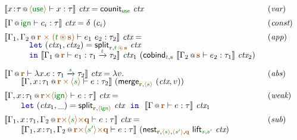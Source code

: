 \begin{figure*}[!t]
\begin{equation*}
\begin{array}{ll}
 \sem{\coctx{x\!:\!\tau}{\alift{\cunit}} \vdash x : \tau }~\ctx =
   \ident{counit}_{\cunit}~\ctx & (\emph{var})
\\[0.5em]
\sem{\coctx{\Gamma}{\czero} \vdash c_i : \tau }~\ctx =
  \delta~(c_i) & (\emph{const})
\\[0.5em]
\sem{\coctx{\Gamma_1, \Gamma_2}{\aclrd{\textbf{r}\;\atimes\;(\cclrd{t} \,\aseq\, \aclrd{\textbf{s}})}} \vdash e_1~e_2 : \tau_2}~\ctx = & (\emph{app})\\[-0.25em]
  \hspace{2.5em}
  \begin{array}{l}  
  \kvd{let}~(\ctx_1, \ctx_2) = \ident{split}_{\aclrd{\textbf{r}}, \cclrd{t} \,\aseq\, \aclrd{\textbf{s}}}~\ctx\\[-0.25em]
  \kvd{in}~\sem{\coctx{\Gamma_1}{\aclrd{\textbf{r}}} \vdash e_1 : \tau_1 \xrightarrow{\cclrd{t}} \tau_2}~\ctx_1~
      (\ident{cobind}_{\cclrd{t}, \aclrd{\textbf{s}}}~\sem{\coctx{\Gamma_2}{\aclrd{\textbf{s}}} \vdash e_2 : \tau_1 }~\ctx_2)
  \end{array}
\\[1.5em]
\sem{\coctx{\Gamma}{\aclrd{\textbf{r}}} \vdash \lambda x.e : \tau_1 \xrightarrow{\cclrd{s}} \tau_2 }~\ctx = \lambda v.& (\emph{abs})\\[-0.25em]
\hspace{2em}\sem{\coctx{\Gamma, x\!:\!\tau_1}{\aclrd{\textbf{r}}\,\atimes\,\alift{\cclrd{s}}} \vdash e : \tau_2}
  ~(\ident{merge}_{\aclrd{\textbf{r}}, \alift{\cclrd{s}}}~(\ctx, v))
\\[0.5em]
\sem{\coctx{\Gamma,x \!:\! \tau_1}{\aclrd{\textbf{r}} \atimes \alift{ \czero }} \vdash e : \tau}~\ctx = & (\emph{weak}) \\
  \hspace{2em}
  \kvd{let}~(\ctx_1, \_) = \ident{split}_{\aclrd{\textbf{r}}, \alift{\czero}}~\ctx~~\kvd{in}~~
  \sem{\coctx{\Gamma}{ \aclrd{\textbf{r}} } \vdash e : \tau}~\ctx_1
\\[0.5em]
\sem{\coctx{\Gamma_1,x\!:\!\tau_1,\Gamma_2}{\aclrd{\textbf{r}} \atimes \alift{\cclrd{s}} \atimes \aclrd{\textbf{q}}} \vdash e : \tau}~\ctx = & (\emph{sub})\\
  \hspace{2em}
  \sem{\coctx{\Gamma_1,x\!:\!\tau_1,\Gamma_2}{\aclrd{\textbf{r}} \atimes \alift{\cclrd{s'}} \atimes \aclrd{\textbf{q}}} \vdash e : \tau}~
  (\ident{nest}_{\aclrd{\textbf{r}}, \alift{\cclrd{s}}, \alift{\cclrd{s'}}, \aclrd{\textbf{q}}}~\ident{lift}_{\cclrd{s}, \cclrd{s'}}~\ctx)

\end{array}
\end{equation*}
\end{figure*}
